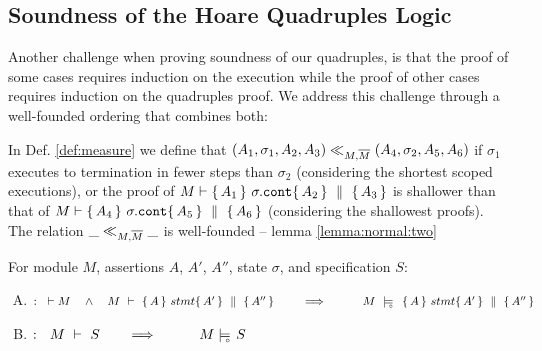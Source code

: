 
\subsection{ Soundness of the Hoare Quadruples Logic}

Another challenge when proving soundness of our quadruples, is that the proof of some cases  requires induction on the execution while the proof of other cases  requires induction on the quadruples
proof.  We address this challenge  through  a well-founded ordering that combines both:


\label{sect:prove:wellfounded}
\label{sect:prove:sound:quadruples}

In Def.  \ref{def:measure}  we define that $(A_1,\sigma_1,A_2, A_3) \ll_{M,\overline{M}}  (A_4,\sigma_2,A_5, A_6)$ if $\sigma_1$ executes to termination  in fewer steps than $\sigma_2$ (considering the shortest scoped executions), or  the proof of $M \vdash  \{\, A_1 \, \}\ \sigma.\mbox{\normalfont{\texttt{cont}}} \{\, A_2 \, \} \, \,\parallel\,\, \{\, A_3 \, \}  $
is shallower than that of  $M \vdash  \{\, A_4 \, \}\ \sigma.\mbox{\normalfont{\texttt{cont}}} \{\, A_5 \, \} \, \,\parallel\,\, \{\, A_6 \, \}  $ (considering the shallowest proofs).  
The relation $\_ \ll_{M,\overline{M}}  \_$  is well-founded -- \cf lemma \ref{lemma:normal:two}
 

\begin{theorem}
\label{t:quadruple:sound}
\label{thm:soundness}
For module  $M$,   assertions $A$, $A'$, $A''$,   state  $\sigma$, and specification $S$:

\begin{enumerate}[(A)]
\item
 $:\strut \   \vdash M  \ \ \ \wedge \ \ \  M\ \vdash\  \quadruple {A} {stmt} {A'} {A''}  \ \ \ \ \ \ \ \Longrightarrow \ \ \ \ \ \  \ \ \  M\ \modelsD\  \quadruple {A} {stmt} {A'} {A''}$
 \item
  $:\strut \  \  \proves{M}{S}\ \ \ \ \ \ \Longrightarrow\ \ \ \ \ \  \ \ \ {M} \modelsD {S}$
 
\end{enumerate}

\end{theorem}

